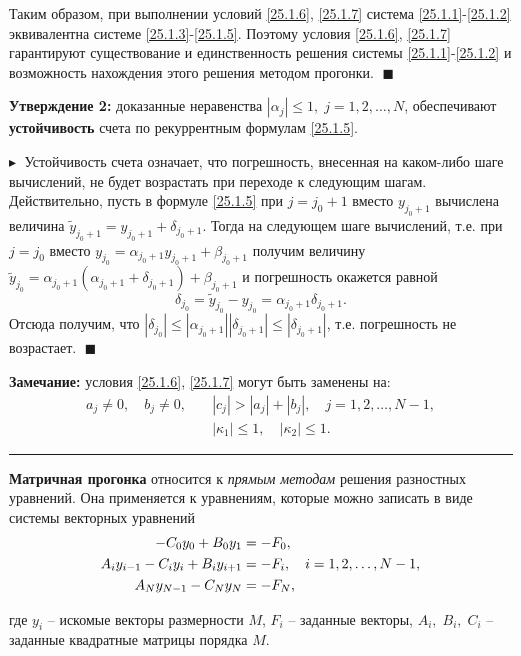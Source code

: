 Таким образом, при выполнении условий \eqref{25.1.6}, \eqref{25.1.7} система \eqref{25.1.1}-\eqref{25.1.2} эквивалентна системе \eqref{25.1.3}-\eqref{25.1.5}. Поэтому условия \eqref{25.1.6}, \eqref{25.1.7} гарантируют существование и единственность решения системы \eqref{25.1.1}-\eqref{25.1.2} и возможность нахождения этого решения методом прогонки. $\;\blacksquare$

\textbf{Утверждение 2:\;} доказанные неравенства $|\alpha_j| \leq 1, \; j = 1, 2, \ldots, N$, обеспечивают \textbf{устойчивость} счета по рекуррентным формулам \eqref{25.1.5}. 

$\blacktriangleright\;$ Устойчивость счета означает, что погрешность, внесенная на каком-либо шаге вычислений, не будет возрастать при переходе к следующим шагам. Действительно, пусть в формуле \eqref{25.1.5} при $j = j_0 + 1$ вместо $y_{j_0+1}$ вычислена величина $\widetilde{y}_{j_0+1} = y_{j_0+1} + \delta_{j_0+1}$. Тогда на следующем шаге вычислений, т.е. при $j = j_0$ вместо $y_{j_0} = \alpha_{j_0+1}y_{j_0+1} + \beta_{j_0+1}$ получим величину $\widetilde{y}_{j_0} = \alpha_{j_0+1}(\alpha_{j_0+1} + \delta_{j_0+1}) + \beta_{j_0+1}$ и погрешность окажется равной 
$$
\delta_{j_0} = \widetilde{y}_{j_0} - y_{j_0} = \alpha_{j_0+1}\delta_{j_0+1}.
$$
Отсюда получим, что $|\delta_{j_0}| \leq |\alpha_{j_0+1}| |\delta_{j_0+1}| \leq |\delta_{j_0+1}| $, т.е. погрешность не возрастает. $\;\blacksquare$

\textbf{Замечание:} условия \eqref{25.1.6}, \eqref{25.1.7} могут быть заменены на: 
\begin{align*} 
    a_j \ne 0, \quad b_j \ne 0,\quad &|c_j| > |a_j| + |b_j|, \quad j = 1, 2, \ldots, N-1,\\
    &|\kappa_1| \leq 1, \quad |\kappa_2| \leq 1.
\end{align*}

\rule{275pt}{0.5pt} 

\textbf{Матричная прогонка} относится к \textit{прямым методам} решения разностных уравнений. Она применяется к уравнениям, которые можно записать в виде системы векторных уравнений 
\setcounter{equation}{0}
\begin{align}
    -C_0 y_0 + B_0 y_1 &= - F_0,\notag \\
    A_i y_{i-1} - C_i y_i + B_i y_{i+1} &= - F_i, \quad i = 1, 2, \ldots, N-1, \label{25.1}\\
    A_N y_{N-1} - C_N y_N &= - F_N,\notag
\end{align}

где $y_i$ -- искомые векторы размерности $M$, $F_i$ -- заданные векторы, $A_i, \; B_i, \; C_i$ -- заданные квадратные матрицы порядка $M$.

